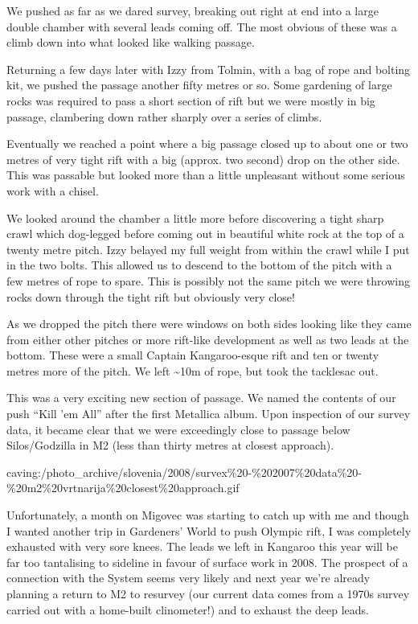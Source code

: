 We pushed as far as we dared survey, breaking out right at end into a
large double chamber with several leads coming off. The most obvious of
these was a climb down into what looked like walking passage.

Returning a few days later with Izzy from Tolmin, with a bag of rope and
bolting kit, we pushed the passage another fifty metres or so. Some
gardening of large rocks was required to pass a short section of rift
but we were mostly in big passage, clambering down rather sharply over a
series of climbs.

Eventually we reached a point where a big passage closed up to about one
or two metres of very tight rift with a big (approx. two second) drop on
the other side. This was passable but looked more than a little
unpleasant without some serious work with a chisel.

We looked around the chamber a little more before discovering a tight
sharp crawl which dog-legged before coming out in beautiful white rock
at the top of a twenty metre pitch. Izzy belayed my full weight from
within the crawl while I put in the two bolts. This allowed us to
descend to the bottom of the pitch with a few metres of rope to spare.
This is possibly not the same pitch we were throwing rocks down through
the tight rift but obviously very close!

As we dropped the pitch there were windows on both sides looking like
they came from either other pitches or more rift-like development as
well as two leads at the bottom. These were a small Captain
Kangaroo-esque rift and ten or twenty metres more of the pitch. We left
\textasciitilde{}10m of rope, but took the tacklesac out.

This was a very exciting new section of passage. We named the contents
of our push ``Kill 'em All'' after the first Metallica album. Upon
inspection of our survey data, it became clear that we were exceedingly
close to passage below Silos/Godzilla in M2 (less than thirty metres at
closest approach).

caving:/photo\_archive/slovenia/2008/survex\%20-\%202007\%20data\%20-\%20m2\%20vrtnarija\%20closest\%20approach.gif

Unfortunately, a month on Migovec was starting to catch up with me and
though I wanted another trip in Gardeners' World to push Olympic rift, I
was completely exhausted with very sore knees. The leads we left in
Kangaroo this year will be far too tantalising to sideline in favour of
surface work in 2008. The prospect of a connection with the System seems
very likely and next year we're already planning a return to M2 to
resurvey (our current data comes from a 1970s survey carried out with a
home-built clinometer!) and to exhaust the deep leads.


